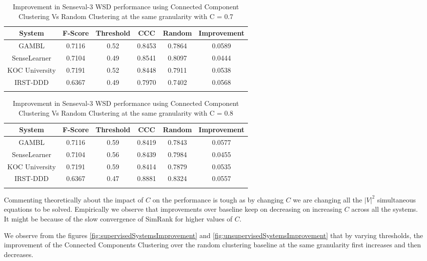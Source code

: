 \begin{center}
\begin{longtable}{| c || c | c | c | c | c |}      
    \hline
    System & F-Score & Threshold & CCC & Random & Improvement \\ \hline
    GAMBL & 0.7116 & 0.52 & 0.8453 & 0.7864 & 0.0589 \\ \hline
    SenseLearner & 0.7104 & 0.49 & 0.8541 & 0.8097 & 0.0444 \\ \hline
    KOC University & 0.7191 & 0.52 & 0.8448 & 0.7911 & 0.0538 \\ \hline
    IRST-DDD & 0.6367 & 0.49 & 0.7970 & 0.7402 & 0.0568 \\ \hline
    \caption{Improvement in Senseval-3 WSD performance using Connected Component Clustering Vs Random Clustering at the same granularity with C = 0.7}
  \label{tab:wsdImprovement0.7}
\end{longtable}
\end{center}

\begin{center}
\begin{longtable}{| c || c | c | c | c | c |}      
    \hline
    System & F-Score & Threshold & CCC & Random & Improvement \\ \hline
    GAMBL & 0.7116 & 0.59 & 0.8419 & 0.7843 & 0.0577 \\ \hline
    SenseLearner & 0.7104 & 0.56 & 0.8439 & 0.7984 & 0.0455 \\ \hline
    KOC University & 0.7191 & 0.59 & 0.8414 & 0.7879 & 0.0535 \\ \hline
    IRST-DDD & 0.6367 & 0.47& 0.8881 & 0.8324 & 0.0557 \\ \hline
    \caption{Improvement in Senseval-3 WSD performance using Connected Component Clustering Vs Random Clustering at the same granularity with C = 0.8}
  \label{tab:wsdImprovement0.8}
\end{longtable}
\end{center}

Commenting theoretically about the impact of $C$ on the performance is tough as by changing $C$ we are changing all the ${|V|}^2$ simultaneous equations to be solved. Empirically we observe that improvements over baseline keep on decreasing on increasing $C$ across all the systems. It might be because of the slow convergence of SimRank for higher values of $C$.

We observe from the figures \ref{fig:supervisedSystemsImprovement} and \ref{fig:unsupervisedSystemsImprovement} that by varying thresholds, the improvement of the Connected Components Clustering over the random clustering baseline at the same granularity first increases and then decreases.

